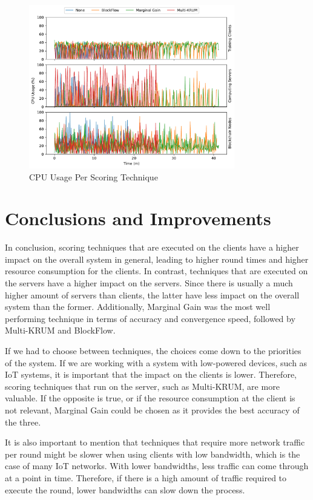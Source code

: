\begin{figure}[!hpb]
    \centering
    \centering
    \includegraphics[width=0.8\textwidth]{graphics/scoring/cpu.pdf}
    \caption{CPU Usage Per Scoring Technique}
    \label{fig:cpu_scoring}
\end{figure}

\section{Conclusions and Improvements}

In conclusion, scoring techniques that are executed on the clients have a higher impact on the overall system in general, leading to higher round times and higher resource consumption for the clients. In contrast, techniques that are executed on the servers have a higher impact on the servers. Since there is usually a much higher amount of servers than clients, the latter have less impact on the overall system than the former. Additionally, Marginal Gain was the most well performing technique in terms of accuracy and convergence speed, followed by Multi-KRUM and BlockFlow.

If we had to choose between techniques, the choices come down to the priorities of the system. If we are working with a system with low-powered devices, such as IoT systems, it is important that the impact on the clients is lower. Therefore, scoring techniques that run on the server, such as Multi-KRUM, are more valuable. If the opposite is true, or if the resource consumption at the client is not relevant, Marginal Gain could be chosen as it provides the best accuracy of the three.

It is also important to mention that techniques that require more network traffic per round might be slower when using clients with low bandwidth, which is the case of many IoT networks. With lower bandwidths, less traffic can come through at a point in time. Therefore, if there is a high amount of traffic required to execute the round, lower bandwidths can slow down the process.


